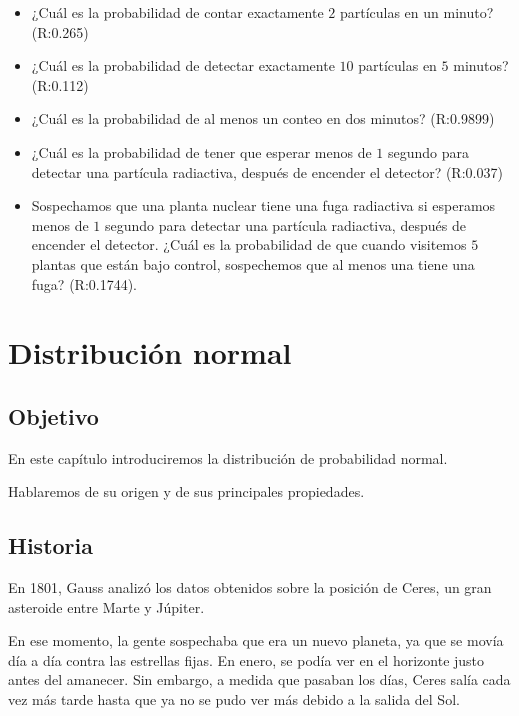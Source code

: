 \documentclass[
]{book}
\begin{document}
\begin{itemize}
\item
  ¿Cuál es la probabilidad de contar exactamente \(2\) partículas en un minuto? (R:0.265)
\item
  ¿Cuál es la probabilidad de detectar exactamente \(10\) partículas en \(5\) minutos? (R:0.112)
\item
  ¿Cuál es la probabilidad de al menos un conteo en dos minutos? (R:0.9899)
\item
  ¿Cuál es la probabilidad de tener que esperar menos de \(1\) segundo para detectar una partícula radiactiva, después de encender el detector? (R:0.037)
\item
  Sospechamos que una planta nuclear tiene una fuga radiactiva si esperamos menos de \(1\) segundo para detectar una partícula radiactiva, después de encender el detector. ¿Cuál es la probabilidad de que cuando visitemos \(5\) plantas que están bajo control, sospechemos que al menos una tiene una fuga? (R:0.1744).
\end{itemize}

\hypertarget{distribuciuxf3n-normal}{%
\chapter{Distribución normal}\label{distribuciuxf3n-normal}}

\hypertarget{objetivo-5}{%
\section{Objetivo}\label{objetivo-5}}

En este capítulo introduciremos la distribución de probabilidad normal.

Hablaremos de su origen y de sus principales propiedades.

\hypertarget{historia}{%
\section{Historia}\label{historia}}

En 1801, Gauss analizó los datos obtenidos sobre la posición de Ceres, un gran asteroide entre Marte y Júpiter.

En ese momento, la gente sospechaba que era un nuevo planeta, ya que se movía día a día contra las estrellas fijas. En enero, se podía ver en el horizonte justo antes del amanecer. Sin embargo, a medida que pasaban los días, Ceres salía cada vez más tarde hasta que ya no se pudo ver más debido a la salida del Sol.
\end{document}
